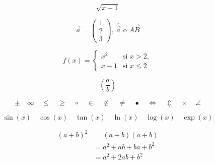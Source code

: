 \begin{equation*}
	\sqrt{x+1}
\end{equation*}

\begin{equation*}
	\vec{a} =\begin{pmatrix} 1\\2\\3 \end{pmatrix} \text{, } \widehat{\vec{a}} \text{ o } \overrightarrow{AB}
\end{equation*}

\begin{equation*}
	f(x) = \begin{cases}
	x^2 & \text{si } x>2,\\
	x-1 & \text{si } x\leq 2
	\end{cases}
\end{equation*}

\begin{equation*}
	\left(\frac{a}{b} \right)
\end{equation*}

\begin{equation*}
	\pm \quad \infty \quad \leq \quad \geq \quad \circ \quad \in \quad \notin \quad \neq \quad \bullet \quad \Leftrightarrow \quad \Updownarrow \quad \times \quad \angle
\end{equation*}

\begin{equation*}
	\sin(x) \quad \cos(x) \quad \tan(x) \quad \ln(x) \quad \log(x) \quad \exp(x)
\end{equation*}

\begin{align*}
	(a+b)^2 &= (a+b)(a+b)\\
	&= a^2+ab+ba+b^2\\
	&=a^2+2ab+b^2
\end{align*}